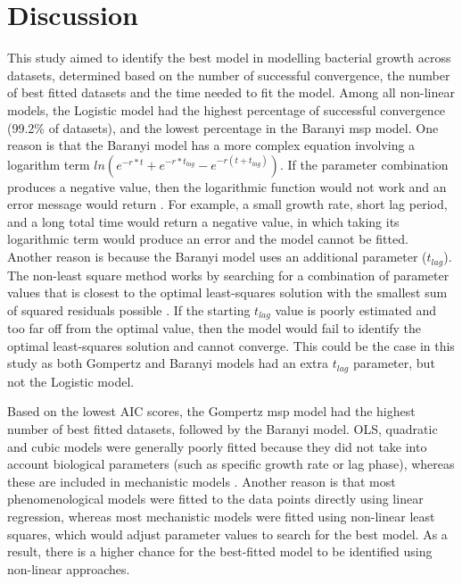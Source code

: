 \documentclass[11pt]{article}
\begin{document}
\section{Discussion}
This study aimed to identify the best model in modelling bacterial growth across datasets, determined based on the number of successful convergence, the number of best fitted datasets and the time needed to fit the model. Among all non-linear models, the Logistic model had the highest percentage of successful convergence (99.2\% of datasets), and the lowest percentage in the Baranyi msp model. One reason is that the Baranyi model has a more complex equation involving a logarithm term $ln(e^{-r*t}+e^{-r*t_{lag}}- e^{-r(t+t_{lag})})$. If the parameter combination produces a negative value, then the logarithmic function would not work and an error message would return \cite{wiscombe_exponential-sum_1977}. For example, a small growth rate, short lag period, and a long total time would return a negative value, in which taking its logarithmic term would produce an error and the model cannot be fitted. Another reason is because the Baranyi model uses an additional parameter (\(t_{lag}\)). The non-least square method works by searching for a combination of parameter values that is closest to the optimal least-squares solution with the smallest sum of squared residuals possible \cite{see_parameter_2018}. If the starting \(t_{lag}\) value is poorly estimated and too far off from the optimal value, then the model would fail to identify the optimal least-squares solution and cannot converge. This could be the case in this study as both Gompertz and Baranyi models had an extra \(t_{lag}\) parameter, but not the Logistic model.  
\vspace{\baselineskip}

Based on the lowest AIC scores, the Gompertz msp model had the highest number of best fitted datasets, followed by the Baranyi model. OLS, quadratic and cubic models were generally poorly fitted because they did not take into account biological parameters (such as specific growth rate or lag phase), whereas these are included in mechanistic models \cite{peleg_microbial_2011}. Another reason is that most phenomenological models were fitted to the data points directly using linear regression, whereas most mechanistic models were fitted using non-linear least squares, which would adjust parameter values to search for the best model. As a result, there is a higher chance for the best-fitted model to be identified using non-linear approaches. 
\vspace{\baselineskip}
\end{document}
